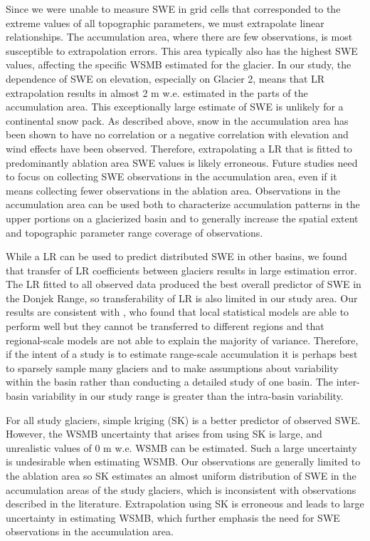 \documentclass[review,oneside, letterpaper]{igs}
\begin{document}
Since we were unable to measure SWE in grid cells that corresponded to the extreme values of all topographic parameters, we must extrapolate linear relationships. The accumulation area, where there are few observations, is most susceptible to extrapolation errors. This area typically also has the highest SWE values, affecting the specific WSMB estimated for the glacier. In our study, the dependence of SWE on elevation, especially on Glacier 2, means that LR extrapolation results in almost 2 m w.e. estimated in the parts of the accumulation area. This exceptionally large estimate of SWE is unlikely for a continental snow pack. As described above, snow in the accumulation area has been shown to have no correlation or a negative correlation with elevation and wind effects have been observed. Therefore, extrapolating a LR that is fitted to predominantly ablation area SWE values is likely erroneous. Future studies need to focus on collecting SWE observations in the accumulation area, even if it means collecting fewer observations in the ablation area. Observations in the accumulation area can be used both to characterize accumulation patterns in the upper portions on a glacierized basin and to generally increase the spatial extent and topographic parameter range coverage of observations.

While a LR can be used to predict distributed SWE in other basins, we found that transfer of LR coefficients between glaciers results in large estimation error. The LR fitted to all observed data produced the best overall predictor of SWE in the Donjek Range, so transferability of LR is also limited in our study area. Our results are consistent with \cite{Grunewald2013}, who found that local statistical models are able to perform well but  they cannot be transferred to different regions and that regional-scale models are not able to explain the majority of variance. Therefore, if the intent of a study is to estimate range-scale accumulation it is perhaps best to sparsely sample many glaciers and to make assumptions about variability within the basin rather than conducting a detailed study of one basin. The inter-basin variability in our study range is greater than the intra-basin variability. 

For all study glaciers, simple kriging (SK) is a better predictor of observed SWE. However, the WSMB uncertainty that arises from using SK is large, and unrealistic values of 0 m w.e. WSMB can be estimated. Such a large uncertainty is undesirable when estimating WSMB.  Our observations are generally limited to the ablation area so SK estimates an almost uniform distribution of SWE in the accumulation areas of the study glaciers, which is inconsistent with observations described in the literature. Extrapolation using SK is erroneous and leads to large uncertainty in estimating WSMB, which further emphasis the need for SWE observations in the accumulation area. 
\end{document}
